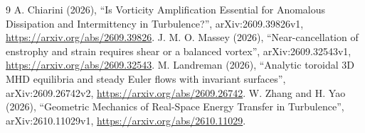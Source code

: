 \begin{thebibliography}{9}
 A. Chiarini (2026), ``Is Vorticity Amplification Essential for Anomalous Dissipation and Intermittency in Turbulence?'', arXiv:2609.39826v1, \url{https://arxiv.org/abs/2609.39826}.
 J. M. O. Massey (2026), ``Near-cancellation of enstrophy and strain requires shear or a balanced vortex'', arXiv:2609.32543v1, \url{https://arxiv.org/abs/2609.32543}.
 M. Landreman (2026), ``Analytic toroidal 3D MHD equilibria and steady Euler flows with invariant surfaces'', arXiv:2609.26742v2, \url{https://arxiv.org/abs/2609.26742}.
 W. Zhang and H. Yao (2026), ``Geometric Mechanics of Real-Space Energy Transfer in Turbulence'', arXiv:2610.11029v1, \url{https://arxiv.org/abs/2610.11029}.
\end{thebibliography}
